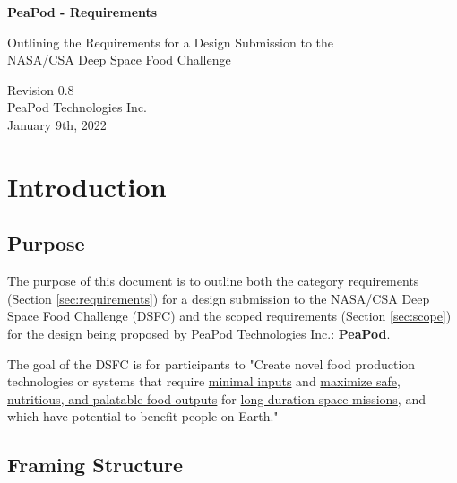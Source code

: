 \documentclass{../tex/report}
\begin{document}
\begin{titlepage}
    \begin{center}
        \vspace*{1.2cm}

        \textbf{\large{PeaPod - Requirements}}

        \vspace{0.5cm}

        Outlining the Requirements for a Design Submission to the \\NASA/CSA Deep Space Food Challenge

        \vfill
        
        \vspace{.75cm}

        Revision 0.8\\
        PeaPod Technologies Inc.\\
        January 9th, 2022

    \end{center}
\end{titlepage}

\thispagestyle{plain}

\tableofcontents
\newpage

\section{Introduction}
\label{sec:intro}

\subsection{Purpose}
\label{sec:purpose}

The purpose of this document is to outline both the category requirements (Section \ref{sec:requirements}) for a design submission to the NASA/CSA Deep Space Food Challenge (DSFC) \cite{dsfc} and the scoped requirements (Section \ref{sec:scope}) for the design being proposed by PeaPod Technologies Inc.: \textbf{PeaPod}.

The goal of the DSFC is for participants to "Create novel food production technologies or systems that require \uline{minimal inputs} and \uline{maximize safe, nutritious, and palatable food outputs} for \uline{long-duration space missions}, and which have potential to benefit people on Earth." \cite{applicantguide}

\subsection{Framing Structure}
\label{sec:structure}
\end{document}
